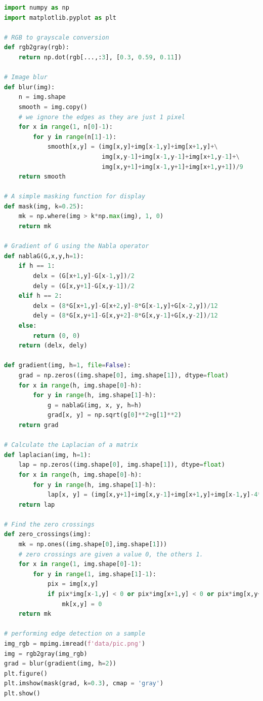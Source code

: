 \begin{lstlisting}[language=Python, caption=Code implementing edge detection techniques and related functions as discussed above]
import numpy as np
import matplotlib.pyplot as plt

# RGB to grayscale conversion
def rgb2gray(rgb):
    return np.dot(rgb[...,:3], [0.3, 0.59, 0.11])

# Image blur
def blur(img):
    n = img.shape
    smooth = img.copy()
    # we ignore the edges as they are just 1 pixel
    for x in range(1, n[0]-1):
        for y in range(n[1]-1):
            smooth[x,y] = (img[x,y]+img[x-1,y]+img[x+1,y]+\
                           img[x,y-1]+img[x-1,y-1]+img[x+1,y-1]+\
                           img[x,y+1]+img[x-1,y+1]+img[x+1,y+1])/9
    return smooth

# A simple masking function for display
def mask(img, k=0.25):
    mk = np.where(img > k*np.max(img), 1, 0)
    return mk

# Gradient of G using the Nabla operator
def nablaG(G,x,y,h=1):
    if h == 1:
        delx = (G[x+1,y]-G[x-1,y])/2
        dely = (G[x,y+1]-G[x,y-1])/2
    elif h == 2:
        delx = (8*G[x+1,y]-G[x+2,y]-8*G[x-1,y]+G[x-2,y])/12
        dely = (8*G[x,y+1]-G[x,y+2]-8*G[x,y-1]+G[x,y-2])/12
    else: 
        return (0, 0)
    return (delx, dely)

def gradient(img, h=1, file=False):
    grad = np.zeros((img.shape[0], img.shape[1]), dtype=float)
    for x in range(h, img.shape[0]-h):
        for y in range(h, img.shape[1]-h):
            g = nablaG(img, x, y, h=h)
            grad[x, y] = np.sqrt(g[0]**2+g[1]**2)
    return grad

# Calculate the Laplacian of a matrix
def laplacian(img, h=1):
    lap = np.zeros((img.shape[0], img.shape[1]), dtype=float)
    for x in range(h, img.shape[0]-h):
        for y in range(h, img.shape[1]-h):
            lap[x, y] = (img[x,y+1]+img[x,y-1]+img[x+1,y]+img[x-1,y]-4*img[x,y])/h**2
    return lap

# Find the zero crossings           
def zero_crossings(img):
    mk = np.ones((img.shape[0],img.shape[1]))
    # zero crossings are given a value 0, the others 1.
    for x in range(1, img.shape[0]-1):
        for y in range(1, img.shape[1]-1):
            pix = img[x,y]
            if pix*img[x-1,y] < 0 or pix*img[x+1,y] < 0 or pix*img[x,y+1] < 0 or pix*img[x,y-1] < 0:
                mk[x,y] = 0
    return mk

# performing edge detection on a sample
img_rgb = mpimg.imread(f'data/pic.png')
img = rgb2gray(img_rgb)
grad = blur(gradient(img, h=2))
plt.figure()
plt.imshow(mask(grad, k=0.3), cmap = 'gray')
plt.show()
\end{lstlisting}

